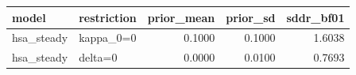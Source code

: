 \begin{tabular}{llrrr}
\toprule
model & restriction & prior\_mean & prior\_sd & sddr\_bf01 \\
\midrule
hsa\_steady & kappa\_0=0 & 0.1000 & 0.1000 & 1.6038 \\
hsa\_steady & delta=0 & 0.0000 & 0.0100 & 0.7693 \\
\bottomrule
\end{tabular}
